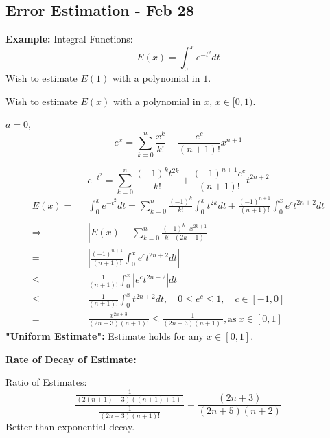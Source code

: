 \documentclass[12pt]{article}
\theoremstyle{plain}
\newcommand{\abs}[1]{\left| #1 \right|}
\begin{document}
\newpage
\subsection{Error Estimation - Feb 28} 

{\color{Brown}
\textbf{Example: } Integral Functions: 
\[
	E(x) = \int_0^x e^{-t^2}dt 
\]
Wish to estimate $E(1)$ with a polynomial in $1$. 

Wish to estimate $E(x)$ with a polynomial in $x$, $x \in [0, 1)$. 

$a = 0$, 
\[
	e^x = \sum_{k=0}^n \frac{x^k}{k!} + \frac{e^c}{(n+1)!} x^{n+1}
\]

\[
	e^{-t^2} = \sum_{k=0}^n \frac{(-1)^k t^{2k}}{k!} + \frac{(-1)^{n+1}e^c}{(n+1)!}
	t^{2n+2}
\]
\begin{align*}
	E(x) 
	=& \int_0^x e^{-t^2}dt = \sum_{k=0}^n \frac{(-1)^k}{k!} \int_0^x t^{2k}dt
	+ \frac{(-1)^{n+1}}{(n+1)!}\int_0^x e^ct^{2n+2} dt	\\\\
	\Rightarrow \qquad \qquad 
	&\abs{E(x) - \sum_{k=0}^n \frac{(-1)^k \cdot x^{2k+1}}{k! \cdot (2k+1)}}\\
	=& \abs{\frac{(-1)^{n+1}}{(n+1)!}\int_0^x e^ct^{2n+2} dt}	\\
	\leq & \frac 1{(n+1)!} \int_0^x \abs{e^ct^{2n+2}} dt\\
	\leq & \frac1{(n+1)!} \int_0^x t^{2n+2} dt, \quad 0 \leq e^c \leq 1,
	\quad c \in [-1, 0]\\
	=& \frac{x^{2n+3}}{(2n+3)(n+1)!} \leq \frac	1{(2n+3)(n+1)!}, 
	\text{as} \ x \in [0, 1]
\end{align*}
\textbf{"Uniform Estimate":} Estimate holds for any $x \in [0, 1]$. 
}

\textbf{Rate of Decay of Estimate:}

Ratio of Estimates: 
\[
	\frac{\frac1{(2(n+1)+3)((n+1)+1)!}}{\frac1{(2n+3)(n+1)!}}
	 = \frac{(2n+3)}{(2n+5)(n+2)} 
\]
Better than exponential decay. 
\end{document}
